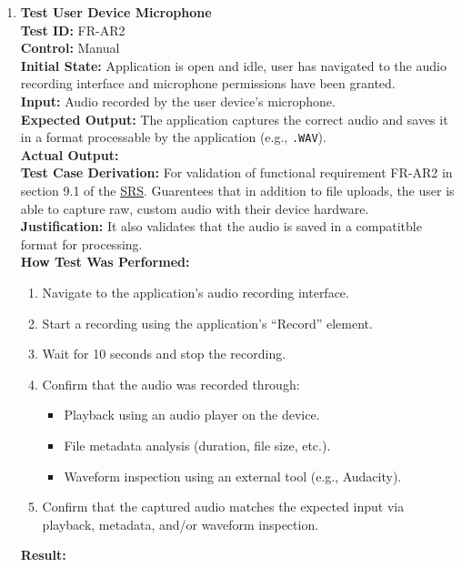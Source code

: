 \documentclass[12pt, titlepage]{article}
\begin{document}
\begin{enumerate}
  \item \textbf{Test User Device Microphone} \\
  \newline
  \textbf{Test ID:} FR-AR2 \\
  \textbf{Control:} Manual \\
  \textbf{Initial State:} Application is open and idle, user has navigated to the audio recording interface and microphone 
  permissions have been granted. \\
  \textbf{Input:} Audio recorded by the user device’s microphone. \\
  \textbf{Expected Output:} The application captures the correct audio and saves it in a format processable by the application 
  (e.g., \texttt{.WAV}). \\
  \textbf{Actual Output:} \\
  \textbf{Test Case Derivation:} For validation of functional requirement FR-AR2 in section 9.1 of the 
  \href{https://github.com/emilyperica/ScoreGen/blob/main/docs/SRS-Volere/SRS.pdf}{SRS}. Guarentees that in addition to file uploads, 
  the user is able to capture raw, custom audio with their device hardware. \\
  \textbf{Justification:} It also validates that the audio is saved in a compatitble format for processing.\\
  \textbf{How Test Was Performed:}
  \begin{enumerate}
      \item Navigate to the application’s audio recording interface.
      \item Start a recording using the application’s “Record” element.
      \item Wait for 10 seconds and stop the recording.
      \item Confirm that the audio was recorded through:
      \begin{itemize}
          \item Playback using an audio player on the device.
          \item File metadata analysis (duration, file size, etc.).
          \item Waveform inspection using an external tool (e.g., Audacity).
      \end{itemize}
      \item Confirm that the captured audio matches the expected input via playback, metadata, and/or waveform inspection.
  \end{enumerate}
  \textbf{Result:}
  

\end{enumerate}
\end{document}
